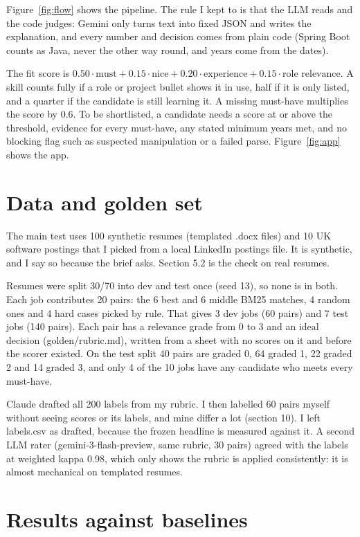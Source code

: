 \documentclass[conference]{styles/acmsiggraph}
\newcommand{\code}[1]{\textsf{\small #1}}
\begin{document}
Figure~\ref{fig:flow} shows the pipeline. The rule I kept to is that the LLM reads and the code judges: Gemini only turns text into fixed JSON and writes the explanation, and every number and decision comes from plain code (Spring Boot counts as Java, never the other way round, and years come from the dates).

The fit score is $0.50\cdot\text{must} + 0.15\cdot\text{nice} + 0.20\cdot\text{experience} + 0.15\cdot\text{role relevance}$. A skill counts fully if a role or project bullet shows it in use, half if it is only listed, and a quarter if the candidate is still learning it. A missing must-have multiplies the score by 0.6. To be shortlisted, a candidate needs a score at or above the threshold, evidence for every must-have, any stated minimum years met, and no blocking flag  such as suspected manipulation or a failed parse. Figure~\ref{fig:app} shows the app.

\section{Data and golden set}

The main test uses 100 synthetic resumes (templated \code{.docx} files) and 10 UK software postings that I picked from a local LinkedIn postings file. It is synthetic, and I say so because the brief asks. Section 5.2 is the check on real resumes.

Resumes were split 30/70 into dev and test once (seed 13), so none is in both. Each job contributes 20 pairs: the 6 best and 6 middle BM25 matches, 4 random ones and 4 hard cases picked by rule. That gives 3 dev jobs (60 pairs) and 7 test jobs (140 pairs). Each pair has a relevance grade from 0 to 3 and an ideal decision (\code{golden/rubric.md}), written from a sheet with no scores on it and before the scorer existed. On the test split 40 pairs are graded 0, 64 graded 1, 22 graded 2 and 14 graded 3, and only 4 of the 10 jobs have any candidate who meets every must-have.

Claude drafted all 200 labels from my rubric. I then labelled 60 pairs myself without seeing scores or its labels, and mine differ a lot (section 10). I left \code{labels.csv} as drafted, because the frozen headline is measured against it. A second LLM rater (\code{gemini-3-flash-preview}, same rubric, 30 pairs) agreed with the labels at weighted kappa 0.98, which only shows the rubric is applied consistently: it is almost mechanical on templated resumes.

\section{Results against baselines}
\end{document}
